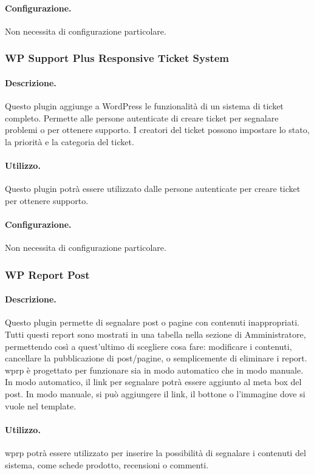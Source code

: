 \paragraph{Configurazione.} Non necessita di configurazione particolare.

\subsubsection{WP Support Plus Responsive Ticket System} \label{plugin:wpsprts}
\paragraph{Descrizione.} Questo plugin aggiunge a WordPress le funzionalità di un sistema di ticket completo. Permette alle persone autenticate di creare ticket per segnalare problemi o per ottenere supporto. I creatori del ticket possono impostare lo stato, la priorità e la categoria del ticket.
\paragraph{Utilizzo.} Questo plugin potrà essere utilizzato dalle persone autenticate per creare ticket per ottenere supporto.
\paragraph{Configurazione.} Non necessita di configurazione particolare.

\subsubsection{WP Report Post} \label{plugin:wprp}
\paragraph{Descrizione.} Questo plugin permette di segnalare post o pagine con contenuti inappropriati. Tutti questi report sono mostrati in una tabella nella sezione di Amministratore, permettendo così a quest'ultimo di scegliere cosa fare: modificare i contenuti, cancellare la pubblicazione di post/pagine, o semplicemente di eliminare i report. \gls{wprp} è progettato per funzionare sia in modo automatico che in modo manuale. In modo automatico, il link per segnalare potrà essere aggiunto al meta box del post. In modo manuale, si può aggiungere il link, il bottone o l'immagine dove si vuole nel template.
\paragraph{Utilizzo.} \gls{wprp} potrà essere utilizzato per inserire la possibilità di segnalare i contenuti del sistema, come schede prodotto, recensioni o commenti.
